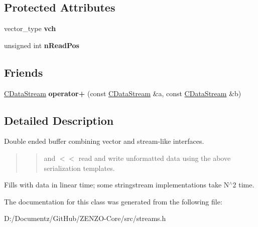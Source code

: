\subsection*{Protected Attributes}
\begin{DoxyCompactItemize}
\item 
\mbox{\label{class_c_data_stream_ac875adb8c720c48abd1a7c82f3452dda}} 
vector\+\_\+type {\bfseries vch}
\item 
\mbox{\label{class_c_data_stream_af1c6a23b6725406d8f3464036a595556}} 
unsigned int {\bfseries n\+Read\+Pos}
\end{DoxyCompactItemize}
\subsection*{Friends}
\begin{DoxyCompactItemize}
\item 
\mbox{\label{class_c_data_stream_ae9d127e586618900bc753dfda97e9401}} 
\mbox{\hyperlink{class_c_data_stream}{C\+Data\+Stream}} {\bfseries operator+} (const \mbox{\hyperlink{class_c_data_stream}{C\+Data\+Stream}} \&a, const \mbox{\hyperlink{class_c_data_stream}{C\+Data\+Stream}} \&b)
\end{DoxyCompactItemize}


\subsection{Detailed Description}
Double ended buffer combining vector and stream-\/like interfaces.

\begin{quote}
\begin{quote}
and $<$$<$ read and write unformatted data using the above serialization templates. \end{quote}
\end{quote}
Fills with data in linear time; some stringstream implementations take N$^\wedge$2 time. 

The documentation for this class was generated from the following file\+:\begin{DoxyCompactItemize}
\item 
D\+:/\+Documentz/\+Git\+Hub/\+Z\+E\+N\+Z\+O-\/\+Core/src/streams.\+h\end{DoxyCompactItemize}
